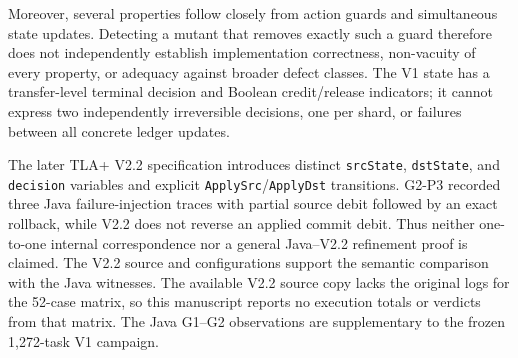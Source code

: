 Moreover,
several properties follow closely from action guards and simultaneous
state updates. Detecting a mutant that removes exactly such a guard
therefore does not independently establish implementation correctness,
non-vacuity of every property, or adequacy against broader defect classes.
The V1 state has a transfer-level terminal decision and Boolean
credit/release indicators; it cannot express two independently
irreversible decisions, one per shard, or failures between all concrete
ledger updates.

The later TLA+ V2.2 specification introduces distinct
\texttt{srcState}, \texttt{dstState}, and \texttt{decision} variables
and explicit \texttt{ApplySrc}/\texttt{ApplyDst} transitions. G2-P3
recorded three Java failure-injection traces with partial source debit
followed by an exact rollback, while V2.2 does not reverse an applied
commit debit. Thus neither one-to-one internal correspondence nor a
general Java--V2.2 refinement proof is claimed. The V2.2 source and
configurations support the semantic comparison with the Java witnesses.
The available V2.2 source copy lacks the original logs for the 52-case
matrix, so this manuscript reports no execution totals or verdicts from
that matrix. The Java G1--G2 observations are supplementary to the frozen
1,272-task V1 campaign.
